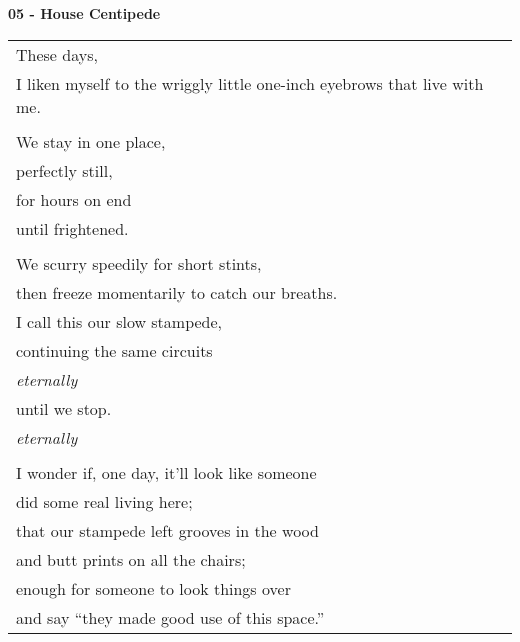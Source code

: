 \documentclass{article}
\begin{document}
\begin{center}
\textbf{05 - House Centipede} \\
\vspace*{2ex}
\begin{tabular}{l} 
These days, \\
I liken myself to the wriggly little one-inch eyebrows that live with me. \\
\\
We stay in one place, \\
perfectly still, \\
for hours on end \\
until frightened. \\
\\
We scurry speedily for short stints, \\
then freeze momentarily to catch our breaths. \\
I call this our slow stampede, \\
continuing the same circuits \\
\textit{eternally} \\
until we stop. \\
\textit{eternally} \\
\\
I wonder if, one day, it'll look like someone \\
did some real living here; \\
that our stampede left grooves in the wood \\
and butt prints on all the chairs; \\
enough for someone to look things over \\
and say ``they made good use of this space.'' \\
\end{tabular}
\end{center}
\end{document}
